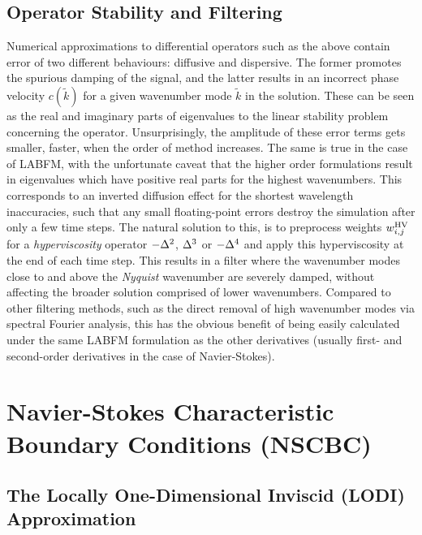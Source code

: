 \subsection{Operator Stability and Filtering}

Numerical approximations to differential operators such as the above contain error of two different behaviours: diffusive and dispersive. The former promotes the spurious damping of the signal, and the latter results in an incorrect phase velocity $c(\tilde{k})$ for a given wavenumber mode $\tilde{k}$ in the solution. These can be seen as the real and imaginary parts of eigenvalues to the linear stability problem concerning the operator. Unsurprisingly, the amplitude of these error terms gets smaller, faster, when the order of method increases. The same is true in the case of LABFM, with the unfortunate caveat that the higher order formulations result in eigenvalues which have positive real parts for the highest wavenumbers. This corresponds to an inverted diffusion effect for the shortest wavelength inaccuracies, such that any small floating-point errors destroy the simulation after only a few time steps. The natural solution to this, is to preprocess weights $w^{\rm{HV}}_{i, j}$ for a \emph{hyperviscosity} operator $-\D^2$, $\D^3$ or $-\D^4$ and apply this hyperviscosity at the end of each time step. This results in a filter where the wavenumber modes close to and above the \emph{Nyquist} wavenumber \cite{nyquist1928CertainTopicsTelegraph} are severely damped, without affecting the broader solution comprised of lower wavenumbers. Compared to other filtering methods, such as the direct removal of high wavenumber modes via spectral Fourier analysis, this has the obvious benefit of being easily calculated under the same LABFM formulation as the other derivatives (usually first- and second-order derivatives in the case of Navier-Stokes).






\section{Navier-Stokes Characteristic Boundary Conditions (NSCBC)}




\subsection{The Locally One-Dimensional Inviscid (LODI) Approximation}

